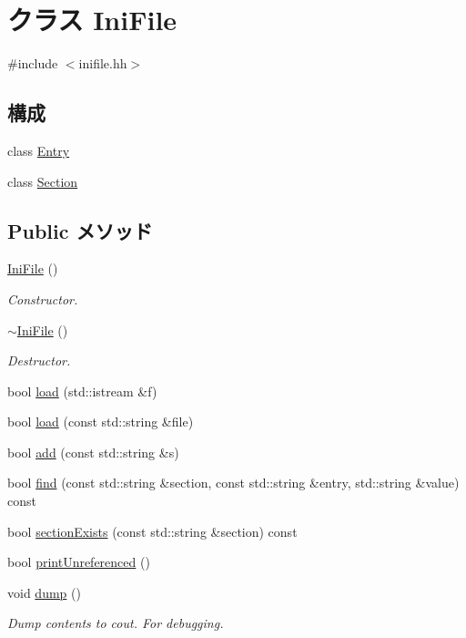 \hypertarget{classIniFile}{
\section{クラス IniFile}
\label{classIniFile}
}


{\ttfamily \#include $<$inifile.hh$>$}\subsection*{構成}
\begin{DoxyCompactItemize}
\item 
class \hyperlink{classIniFile_1_1Entry}{Entry}
\item 
class \hyperlink{classIniFile_1_1Section}{Section}
\end{DoxyCompactItemize}
\subsection*{Public メソッド}
\begin{DoxyCompactItemize}
\item 
\hyperlink{classIniFile_aea7ed2d74f0ddb1182cea26dff360606}{IniFile} ()
\begin{DoxyCompactList}\small\item\em Constructor. \item\end{DoxyCompactList}\item 
\hyperlink{classIniFile_ae0e356ba5d5901a4fbc0e1e7d1737590}{$\sim$IniFile} ()
\begin{DoxyCompactList}\small\item\em Destructor. \item\end{DoxyCompactList}\item 
bool \hyperlink{classIniFile_ad078477a284c35e76732419bb20e1162}{load} (std::istream \&f)
\item 
bool \hyperlink{classIniFile_a9c68305a6794dc960db947d68839b724}{load} (const std::string \&file)
\item 
bool \hyperlink{classIniFile_af29519b90a46a24b4b0910b17a89c455}{add} (const std::string \&s)
\item 
bool \hyperlink{classIniFile_a4463b62ff5381e1170a7a78c212acf3b}{find} (const std::string \&section, const std::string \&entry, std::string \&value) const 
\item 
bool \hyperlink{classIniFile_a1f4425e50772e481fcb9eae39b6efa24}{sectionExists} (const std::string \&section) const 
\item 
bool \hyperlink{classIniFile_a667c11ebcd087cd37343736725fa0071}{printUnreferenced} ()
\item 
void \hyperlink{classIniFile_accd2600060dbaee3a3b41aed4034c63c}{dump} ()
\begin{DoxyCompactList}\small\item\em Dump contents to cout. For debugging. \item\end{DoxyCompactList}\end{DoxyCompactItemize}
